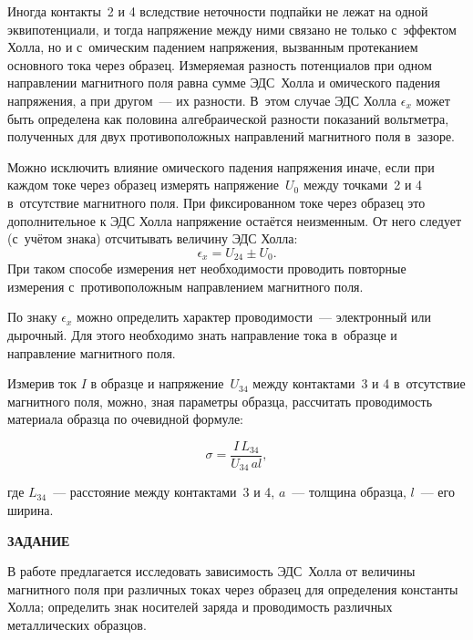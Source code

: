 Иногда контакты~2 и 4 вследствие неточности подпайки не лежат на одной эквипотенциали, и тогда напряжение между ними связано не только с~эффектом Холла, но и с~омическим падением напряжения, вызванным протеканием основного тока через образец. Измеряемая разность потенциалов при одном направлении магнитного поля равна сумме ЭДС~Холла и омического падения напряжения, а при другом~--- их разности. В~этом случае ЭДС Холла $\epsilon_x$ может быть определена как половина
алгебраической разности показаний вольтметра, полученных для двух противоположных направлений магнитного поля в~зазоре.


Можно исключить влияние омического падения напряжения иначе, если при каждом токе через образец измерять
напряжение~$U_0$ между точками~2 и 4 в~отсутствие магнитного поля. При фиксированном токе через образец это
дополнительное к ЭДС Холла напряжение остаётся неизменным. От него следует (с~учётом знака) отсчитывать величину
ЭДС Холла:
\begin{equation}
\epsilon_x=U_{24}\pm U_0.
\label{eq3.5.1}
\end{equation}
При таком способе измерения нет необходимости проводить повторные измерения с~противоположным направлением магнитного поля.

По знаку $\epsilon_x$ можно определить характер проводимости~--- электронный или дырочный. Для этого необходимо знать
направление тока в~образце и направление магнитного поля.

Измерив ток $I$ в образце и напряжение~$U_{34}$ между контактами~3 и 4 в~отсутствие магнитного поля, можно, зная
параметры образца, рассчитать проводимость материала образца по очевидной формуле:

\begin{equation}
\sigma=\frac{I\, L_{34}}{U_{34}\, al},
\end{equation}

где $L_{34}$~--- расстояние между контактами~3 и 4, $a$~--- толщина образца, $l$~--- его ширина.

{\Large \bf ЗАДАНИЕ}

В работе предлагается исследовать зависимость ЭДС~Холла от величины магнитного поля при различных токах через образец для определения константы Холла; определить знак носителей заряда и проводимость различных металлических образцов.

